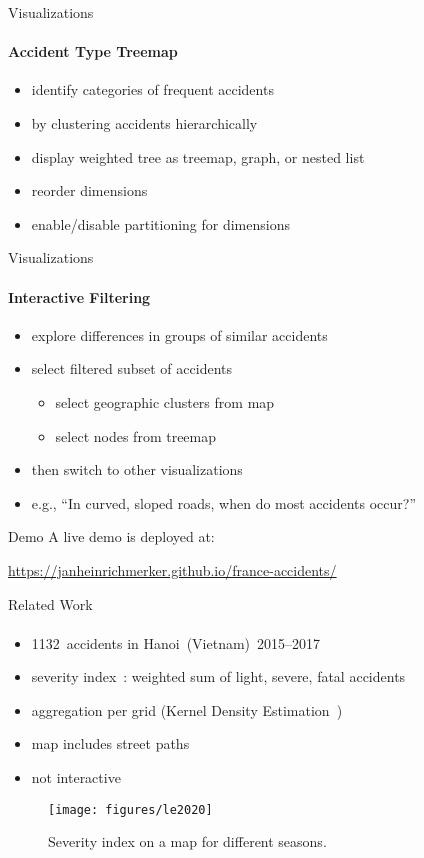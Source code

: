 \documentclass[english]{mlutalk}
\begin{document}
\begin{frame}{Visualizations}
  \framesubtitle{Accident Type Treemap}
  \begin{itemize}
    \setlength{\itemsep}{3ex}
    \item identify categories of frequent accidents
    \item by clustering accidents hierarchically
    \item display weighted tree as treemap, graph, or nested list
    \item reorder dimensions
    \item enable/disable partitioning for dimensions
  \end{itemize}
\end{frame}

\begin{frame}{Visualizations}
  \framesubtitle{Interactive Filtering}
  \begin{itemize}
    \setlength{\itemsep}{3ex}
    \item explore differences in groups of similar accidents
    \item select filtered subset of accidents
    \begin{itemize}
      \item select geographic clusters from map
      \item select nodes from treemap
    \end{itemize}
    \item then switch to other visualizations
    \item e.g., \enquote{In curved, sloped roads, when do most accidents occur?}
  \end{itemize}
\end{frame}

\begin{frame}{Demo}
  \centering
  A live demo is deployed at:
  \vspace{2ex}
  \par
  \enskip
  \footnotesize
  \url{https://janheinrichmerker.github.io/france-accidents/}
\end{frame}

\begin{frame}{Related Work}
  \framesubtitle{\textcite{LeLL2020}}
  \begin{itemize}
    \item 1132~accidents in Hanoi~(Vietnam)~2015--2017
    \item severity index~\cite{GeurtsWBV2004}: weighted sum of light, severe, fatal accidents
    \item aggregation per grid (Kernel Density Estimation~\cite{Anderson2009})
    \item map includes street paths
    \item not interactive
  \end{itemize}
  \begin{figure}
    \centering
    \texttt{[image: figures/le2020]}
    \caption{Severity index on a map for different seasons.~\cite{LeLL2020}}
  \end{figure}
\end{frame}
\end{document}
